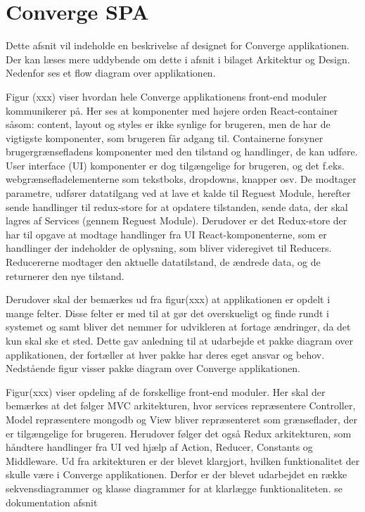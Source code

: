 \section{Converge SPA}

Dette afsnit vil indeholde en beskrivelse af designet for Converge applikationen. Der kan læses mere uddybende om dette i afsnit  i bilaget Arkitektur og Design. Nedenfor ses et flow diagram over applikationen. 


Figur (xxx) viser hvordan hele Converge applikationens front-end moduler kommunikerer på. Her ses at komponenter med højere orden React-container såsom: content, layout og styles er ikke synlige for brugeren, men de har de vigtigste komponenter, som brugeren får adgang til. Containerne forsyner brugergrænsefladens komponenter med den tilstand og handlinger, de kan udføre. 
User interface (UI) komponenter er dog tilgængelige for brugeren, og det f.eks. webgrænsefladelementerne som tekstboks, dropdowns, knapper osv. De modtager parametre, udfører datatilgang ved at lave et kalde til Reguest Module, herefter sende handlinger til redux-store for at opdatere tilstanden, sende data, der skal lagres af Services (gennem Reguest Module). 
Derudover er det Redux-store der har til opgave at modtage handlinger fra UI React-komponenterne, som er handlinger der indeholder de oplysning, som bliver videregivet til Reducers. Reducererne modtager den aktuelle datatilstand, de ændrede data, og de returnerer den nye tilstand. 

Derudover skal der bemærkes ud fra figur(xxx) at applikationen er opdelt i mange felter. Disse felter er med til at gør det overskueligt og finde rundt i systemet og samt bliver det nemmer for udvikleren at fortage ændringer, da det kun skal ske et sted. Dette gav anledning til at udarbejde et pakke diagram over applikationen, der fortæller at hver pakke har deres eget ansvar og behov. Nedstående figur visser pakke diagram over Converge applikationen. 


Figur(xxx) viser opdeling af de forskellige front-end moduler. Her skal der bemærkes at det følger MVC arkitekturen, hvor services repræsentere Controller, Model repræsentere mongodb og View bliver repræsenteret som grænseflader, der er tilgængelige for brugeren. Herudover følger det også Redux arkitekturen, som håndtere handlinger fra UI ved hjælp af Action, Reducer, Constants og Middleware.    
Ud fra arkitekturen er der blevet klargjort, hvilken funktionalitet der skulle være i Converge applikationen. Derfor er der blevet udarbejdet en række sekvensdiagrammer og klasse diagrammer for at klarlægge funktionaliteten. se dokumentation afsnit   